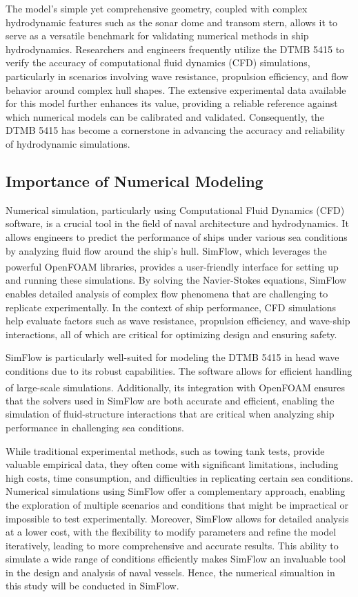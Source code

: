 \documentclass[12pt]{article} %
\begin{document}
The model’s simple yet comprehensive geometry, coupled with complex hydrodynamic features such 
as the sonar dome and transom stern, allows it to serve as a versatile benchmark for validating 
numerical methods in ship hydrodynamics. Researchers and engineers frequently utilize the DTMB 
5415 to verify the accuracy of computational fluid dynamics (CFD) simulations, particularly in 
scenarios involving wave resistance, propulsion efficiency, and flow behavior around complex 
hull shapes\cite{elhadad2023}. The extensive experimental data available for this model further 
enhances its value, 
providing a reliable reference against which numerical models can be calibrated and validated. 
Consequently, the DTMB 5415 has become a cornerstone in advancing the accuracy and reliability of 
hydrodynamic simulations.

\subsection{Importance of Numerical Modeling}
Numerical simulation, particularly using Computational Fluid Dynamics (CFD) software, is a crucial tool in the field of naval architecture and hydrodynamics. It allows engineers to predict the performance of ships under various sea conditions by analyzing fluid flow around the ship's hull. SimFlow, which leverages the powerful OpenFOAM\textsuperscript{\textregistered} libraries, provides a user-friendly interface for setting up and running these simulations. By solving the Navier-Stokes equations, SimFlow enables detailed analysis of complex flow phenomena that are challenging to replicate experimentally. In the context of ship performance, CFD simulations help evaluate factors such as wave resistance, propulsion efficiency, and wave-ship interactions, all of which are critical for optimizing design and ensuring safety.

SimFlow is particularly well-suited for modeling the DTMB 5415 in head wave conditions due to its 
robust capabilities. The software allows for efficient handling of large-scale 
simulations. Additionally, its integration with OpenFOAM\textsuperscript{\textregistered} ensures 
that the solvers used in SimFlow are both accurate and efficient, enabling the simulation of 
fluid-structure interactions that are critical when analyzing ship performance in challenging 
sea conditions.

While traditional experimental methods, such as towing tank tests, provide valuable empirical data, they often come with significant limitations, including high costs, time consumption, and difficulties in replicating certain sea conditions. Numerical simulations using SimFlow offer a complementary approach, enabling the exploration of multiple scenarios and conditions that might be impractical or impossible to test experimentally. Moreover, SimFlow allows for detailed analysis at a lower cost, with the flexibility to modify parameters and refine the model iteratively, leading to more comprehensive and accurate results. This ability to simulate a wide range of conditions efficiently makes SimFlow an invaluable tool in the design and analysis of naval vessels.
Hence, the numerical simualtion in this study will be conducted in SimFlow.
\end{document}
